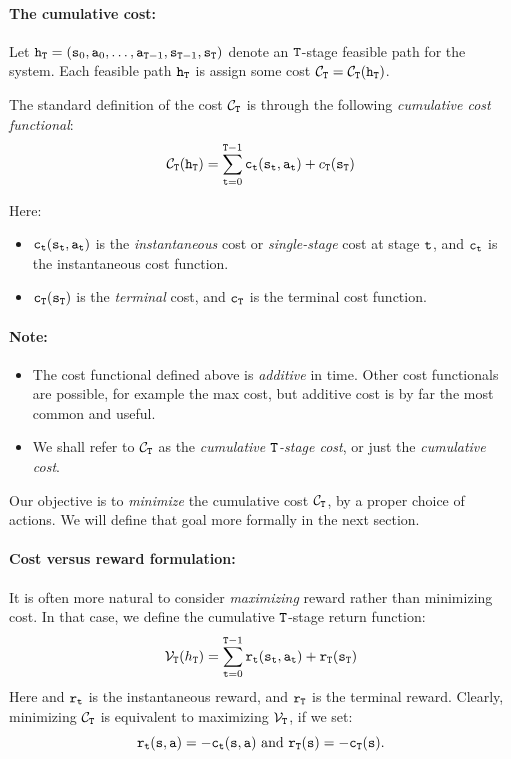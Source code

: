 \paragraph{The cumulative cost:}
Let ${{\tt h}_{\tt T}} = ({{\tt s}_0},{{\tt a}_0}, \ldots
,{{\tt a}_{{\tt T} - 1}},{{\tt s}_{{\tt T} -
1}},{{\tt s}_{\tt T}})$ denote an ${\tt T}$-stage feasible path
for the system. Each feasible path ${{\tt h}_{\tt T}}$ is assign
some cost ${\mathcal{C}_{\tt T}} =
{\mathcal{C}_{\tt T}}({{\tt h}_{\tt T}})$.

The standard definition of the cost ${\mathcal{C}_{\tt T}}$ is through
the following \emph{cumulative cost functional}:
\[{\mathcal{C}_{\tt T}}({{\tt h}_{\tt T}}) = \sum_{{\tt t} = 0}^{{\tt T} - 1} {{{\tt c}_{{\tt t}}}({{\tt s}_{{\tt t}}},{{\tt a}_{{\tt t}}}) + {c_{\tt T}}({{\tt s}_{\tt T}})} \]

Here:
    \begin{itemize}
    \item
${{\tt c}_{{\tt t}}}({{\tt s}_{{\tt t}}},{{\tt a}_{{\tt t}}})$ is the
\emph{instantaneous}  cost or \emph{single-stage }cost at stage
${\tt t}$, and ${{\tt c}_{{\tt t}}}$ is the instantaneous cost function.
    \item
${{\tt c}_{\tt T}}({{\tt s}_{\tt T}})$ is the \emph{terminal} cost,
and ${{\tt c}_{\tt T}}$ is the terminal cost function.
  \end{itemize}

\paragraph{Note:}
\begin{itemize}
  \item The cost functional defined above is \emph{additive} in time. Other cost functionals are possible, for example the max cost, but additive cost is by far the most common and useful.
  \item We shall refer to ${\mathcal{C}_{\tt T}}$ as the \emph{cumulative ${\tt T}$-stage cost}, or just the \emph{cumulative cost}.
\end{itemize}

Our objective is to \emph{minimize} the cumulative cost
${\mathcal{C}_{\tt T}}$, by a proper choice of actions. We will define
that goal more formally in the next section.

\paragraph{Cost versus reward formulation: }
It is often more natural to consider \emph{maximizing} reward rather
than minimizing cost.  In that case, we define the cumulative
${\tt T}$-stage return function:
$${\mathcal{V}_{\tt T}}({h_{\tt T}}) = \sum_{{\tt t} = 0}^{{\tt T} - 1} {{{\tt r}_{{\tt t}}}({{\tt s}_{{\tt t}}},{{\tt a}_{{\tt t}}}) + {{\tt r}_{\tt T}}({{\tt s}_{\tt T}})} $$
Here and ${{\tt r}_{{\tt t}}}$ is the instantaneous reward, and
${{\tt r}_{\tt T}}$ is the terminal reward. Clearly, minimizing
${\mathcal{C}_{\tt T}}$ is equivalent to maximizing
${\mathcal{V}_{\tt T}}$, if we set:
$${{\tt r}_{{\tt t}}}({\tt s},{\tt a}) =  - {{\tt c}_{{\tt t}}}({\tt s},{\tt a}) \text{ and }{{\tt r}_{\tt T}}({\tt s}) =  - {{\tt c}_{\tt T}}({\tt s}).$$

